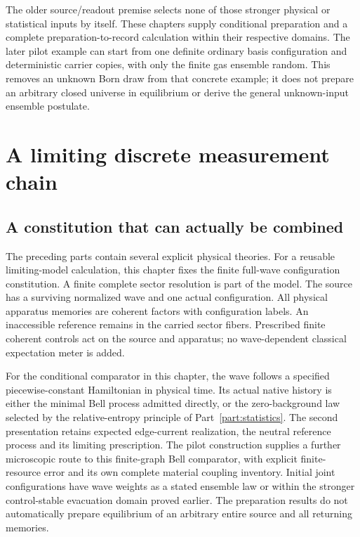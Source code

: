 \documentclass[11pt,oneside,openany]{book}
\theoremstyle{definition}
\theoremstyle{remark}\newtheorem{remark}[theorem]{Remark}
\begin{document}
The older source/readout premise selects none of those stronger physical
or statistical inputs by itself. These chapters supply conditional
preparation and a complete preparation-to-record calculation within their
respective domains. The later pilot example can start from one definite
ordinary basis configuration and deterministic carrier copies, with only
the finite gas ensemble random. This removes an unknown Born draw from
that concrete example; it does not prepare an arbitrary closed universe in
equilibrium or derive the general unknown-input ensemble postulate.



\chapter{A limiting discrete measurement chain}
\label{int:chain-chapter}

\section{A constitution that can actually be combined}
The preceding parts contain several explicit physical theories. For a reusable limiting-model calculation, this chapter fixes the finite full-wave configuration constitution. A finite complete sector resolution is part of the model. The source has a surviving normalized wave and one actual configuration. All physical apparatus memories are coherent factors with configuration labels. An inaccessible reference remains in the carried sector fibers. Prescribed finite coherent controls act on the source and apparatus; no wave-dependent classical expectation meter is added.

For the conditional comparator in this chapter, the wave follows a specified piecewise-constant Hamiltonian in physical time. Its actual native history is either the minimal Bell process admitted directly, or the zero-background law selected by the relative-entropy principle of Part~\ref{part:statistics}. The second presentation retains expected edge-current realization, the neutral reference process and its limiting prescription. The pilot construction supplies a further microscopic route to this finite-graph Bell comparator, with explicit finite-resource error and its own complete material coupling inventory. Initial joint configurations have wave weights as a stated ensemble law or within the stronger control-stable evacuation domain proved earlier. The preparation results do not automatically prepare equilibrium of an arbitrary entire source and all returning memories.
\end{document}
